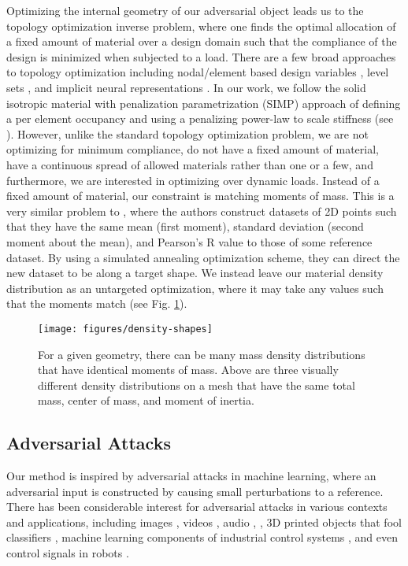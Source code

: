 Optimizing the internal geometry of our adversarial object leads us to the topology optimization inverse problem, where one finds the optimal allocation of a fixed amount of material over a design domain such that the compliance of the design is minimized when subjected to a load. There are a few broad approaches to topology optimization including nodal/element based design variables \cite{XIE1993885,simp-bendsoe}, level sets \cite{ALLAIRE20021125, WANG2003227}, and implicit neural representations \cite{ntopo}.
In our work, we follow the solid isotropic material with penalization parametrization (SIMP) approach of defining a per element occupancy and using a penalizing power-law to scale stiffness (see \cite{bendsoe-book}).
However, unlike the standard topology optimization problem, we are not optimizing for minimum compliance, do not have a fixed amount of material, have a continuous spread of allowed materials rather than one or a few, and furthermore, we are interested in optimizing over dynamic loads. 
Instead of a fixed amount of material, our constraint is matching moments of mass. This is a very similar problem to \citet{same-stats}, where the authors construct datasets of 2D points such that they have the same mean (first moment), standard deviation (second moment about the mean), and Pearson's R value to those of some reference dataset. By using a simulated annealing optimization scheme, they can direct the new dataset to be along a target shape. We instead leave our material density distribution as an untargeted optimization, where it may take any values such that the moments match (see Fig. \ref{fig:density-shapes}).
\begin{figure}[t!]
	\centering
	\texttt{[image: figures/density-shapes]}
	\vspace{-0.7cm}
	\caption{For a given geometry, there can be many mass density distributions that have identical moments of mass. Above are three visually different density distributions on a mesh that have the same total mass, center of mass, and moment of inertia.}
	\label{fig:density-shapes}
\end{figure}

\subsection{Adversarial Attacks}
Our method is inspired by adversarial attacks in machine learning, where an adversarial input is constructed by causing small perturbations to a reference.
There has been considerable interest for adversarial attacks in various contexts and applications, including images \cite{Szegedy2014, goodfellow2014explaining, moosavi2016deepfool,kurakin2018adversarial, parametric-adversary-derek}, videos \cite{Li2018AdversarialPA,sparse-adv-video, linxi-video,Li2021AdversarialAO,10378215-kim}, audio \cite{smack-audio,Chen2019WhoIR,aaecaptcha,Liu2019WeightedSamplingAA}, , 3D printed objects that fool classifiers \cite{pmlr-v80-athalye18b, Huang2023TowardsTT}, machine learning components of industrial control systems \cite{aa-erba, ANTHI2021102717, figueroa-ic}, and even control signals in robots \cite{otomo2022adversarial}.


